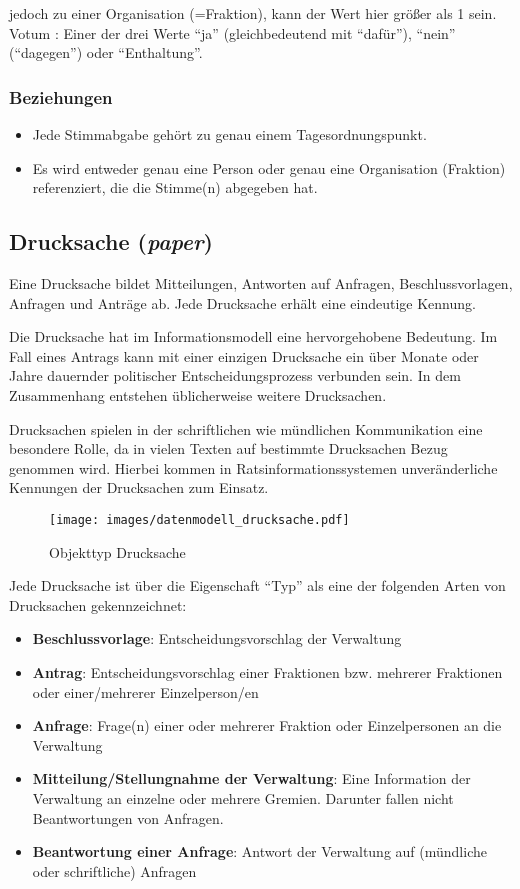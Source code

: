 \documentclass[,a4paper]{article}
\makeatletter
\def\maxwidth{\ifdim\Gin@nat@width>\linewidth\linewidth
\else\Gin@nat@width\fi}
\let\Oldincludegraphics\includegraphics
\renewcommand{\includegraphics}[1]{\Oldincludegraphics[width=\maxwidth]{#1}}
\makeatother
\begin{document}
jedoch zu einer Organisation (=Fraktion), kann der Wert hier größer als
1 sein. Votum : Einer der drei Werte ``ja'' (gleichbedeutend mit
``dafür''), ``nein'' (``dagegen'') oder ``Enthaltung''.

\subsubsection{Beziehungen}

\begin{itemize}
\item
  Jede Stimmabgabe gehört zu genau einem Tagesordnungspunkt.
\item
  Es wird entweder genau eine Person oder genau eine Organisation
  (Fraktion) referenziert, die die Stimme(n) abgegeben hat.
\end{itemize}

\subsection{Drucksache (\emph{paper})}

Eine Drucksache bildet Mitteilungen, Antworten auf Anfragen,
Beschlussvorlagen, Anfragen und Anträge ab. Jede Drucksache erhält eine
eindeutige Kennung.

Die Drucksache hat im Informationsmodell eine hervorgehobene Bedeutung.
Im Fall eines Antrags kann mit einer einzigen Drucksache ein über Monate
oder Jahre dauernder politischer Entscheidungsprozess verbunden sein. In
dem Zusammenhang entstehen üblicherweise weitere Drucksachen.

Drucksachen spielen in der schriftlichen wie mündlichen Kommunikation
eine besondere Rolle, da in vielen Texten auf bestimmte Drucksachen
Bezug genommen wird. Hierbei kommen in Ratsinformationssystemen
unveränderliche Kennungen der Drucksachen zum Einsatz.

\begin{figure}[htbp]
\centering
\texttt{[image: images/datenmodell\_drucksache.pdf]}
\caption{Objekttyp Drucksache}
\end{figure}

Jede Drucksache ist über die Eigenschaft ``Typ'' als eine der folgenden
Arten von Drucksachen gekennzeichnet:

\begin{itemize}
\item
  \textbf{Beschlussvorlage}: Entscheidungsvorschlag der Verwaltung
\item
  \textbf{Antrag}: Entscheidungsvorschlag einer Fraktionen bzw. mehrerer
  Fraktionen oder einer/mehrerer Einzelperson/en
\item
  \textbf{Anfrage}: Frage(n) einer oder mehrerer Fraktion oder
  Einzelpersonen an die Verwaltung
\item
  \textbf{Mitteilung/Stellungnahme der Verwaltung}: Eine Information der
  Verwaltung an einzelne oder mehrere Gremien. Darunter fallen nicht
  Beantwortungen von Anfragen.
\item
  \textbf{Beantwortung einer Anfrage}: Antwort der Verwaltung auf
  (mündliche oder schriftliche) Anfragen
\end{itemize}
\end{document}
